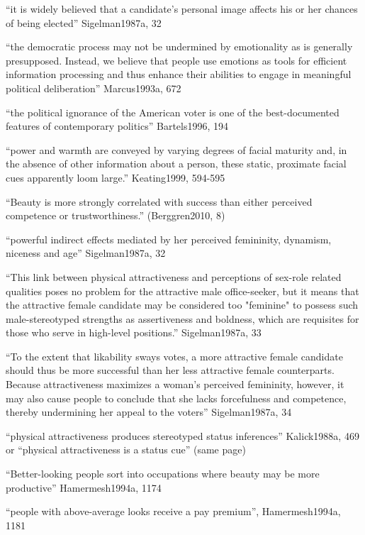 ``it is widely believed that a candidate's personal image affects his or her chances of being elected'' Sigelman1987a, 32

``the democratic process may not be undermined by emotionality as is generally presupposed. Instead, we believe that people use emotions as tools for efficient information processing and thus enhance their abilities to engage in meaningful political deliberation'' Marcus1993a, 672

``the political ignorance of the American voter is one of the best-documented features of contemporary politics'' Bartels1996, 194

``power and warmth are conveyed by varying degrees of facial maturity and, in the absence of other information about a person, these static, proximate facial cues apparently loom large.'' Keating1999, 594-595

``Beauty is more strongly correlated with success than either perceived competence or trustworthiness.'' (Berggren2010, 8)



``powerful indirect effects mediated by her perceived femininity, dynamism, niceness and age'' Sigelman1987a, 32

``This link between physical attractiveness and perceptions of sex-role related qualities poses no problem for the attractive male office-seeker, but it means that the attractive female candidate may be considered too "feminine" to possess such male-stereotyped strengths as assertiveness and boldness, which are requisites for those who serve in high-level positions.''  Sigelman1987a, 33

``To the extent that likability sways votes, a more attractive female candidate should thus be more successful than her less attractive female counterparts. Because attractiveness maximizes a woman's perceived femininity, however, it may also cause people to conclude that she lacks forcefulness and competence, thereby undermining her appeal to the voters''  Sigelman1987a, 34


``physical attractiveness produces stereotyped status inferences'' Kalick1988a, 469 or ``physical attractiveness is a status cue'' (same page)

``Better-looking people sort into occupations where beauty may be more productive'' Hamermesh1994a, 1174

``people with above-average looks receive a pay premium'', Hamermesh1994a, 1181

